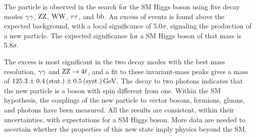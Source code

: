 \documentclass[11pt,twoside,a4paper,cmspaper,final,collab]{cms-tdr}
\begin{document}
The particle is observed in the search for the SM Higgs boson
using five decay modes $\gamma\gamma$, $\mathrm{Z}\mathrm{Z}$, $\mathrm{W}\mathrm{W}$, $\tau\tau$, and $\mathrm{b}\mathrm{b}$.
An excess of events is found above the expected background, with a local significance of
5.0$\sigma$, signaling the production of a new particle.  The expected
significance for a SM Higgs boson of that mass is 5.8$\sigma$.

The excess is most significant in the two decay modes with the best mass resolution, $\gamma\gamma$ and
$\mathrm{Z}\mathrm{Z} \to 4\ell$, and a fit to these invariant-mass peaks gives a mass of $125.3\pm 0.4\,\text{(stat.)}\pm
0.5\,\text{(syst.)}\,\text{Ge\hspace{-.08em}V}$.  The decay to two photons indicates that the new particle is a boson
with spin different from one.
Within the SM hypothesis, the couplings of the new particle to vector bosons, fermions,
gluons, and photons have been measured. All the results are consistent, within their uncertainties, with
expectations for a SM Higgs boson.
More data are needed to ascertain whether the properties of this new state imply physics beyond the SM.
\end{document}
